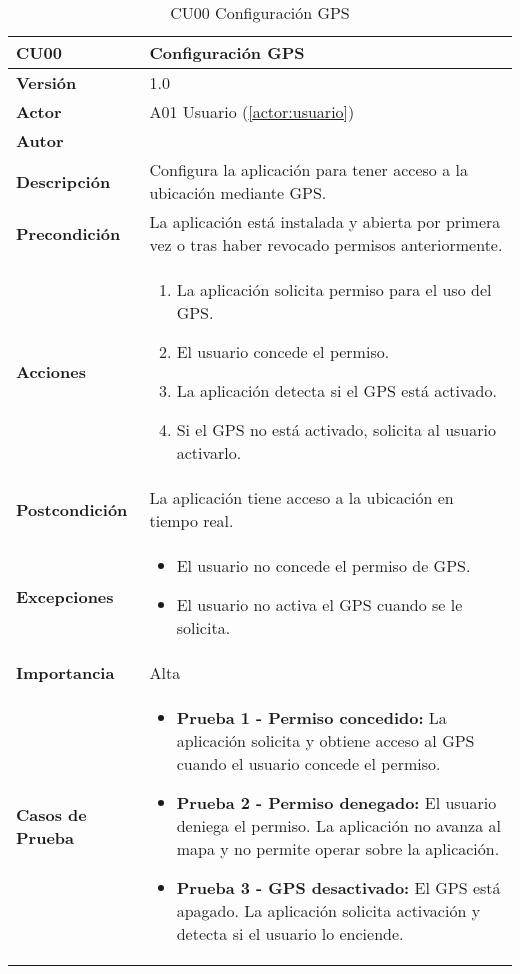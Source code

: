 \begin{table}[H]
	\centering
	\begin{tabularx}{\linewidth}{ p{} p{} }
		\toprule
		\textbf{CU00}    & \textbf{Configuración GPS} \\
		\toprule
		\textbf{Versión}              & 1.0    \\
		\textbf{Actor}                & A01 Usuario (\ref{actor:usuario}) \\
		\textbf{Autor}                & \autor \\
		\textbf{Descripción}          & Configura la aplicación para tener acceso a la ubicación mediante GPS. \\
		\textbf{Precondición}         & La aplicación está instalada y abierta por primera vez o tras haber revocado permisos anteriormente. \\
		\textbf{Acciones}             &
		\begin{enumerate}
			\def\labelenumi{\arabic{enumi}.}
			\tightlist
			\item La aplicación solicita permiso para el uso del GPS.
			\item El usuario concede el permiso.
			\item La aplicación detecta si el GPS está activado.
			\item Si el GPS no está activado, solicita al usuario activarlo.
		\end{enumerate}\\
		\textbf{Postcondición}        & La aplicación tiene acceso a la ubicación en tiempo real. \\
		\textbf{Excepciones}          & 
		\begin{itemize}
			\tightlist
			\item El usuario no concede el permiso de GPS.
			\item El usuario no activa el GPS cuando se le solicita.
		\end{itemize}\\
		\textbf{Importancia}          & Alta \\
		\textbf{Casos de Prueba}      & 
		\begin{itemize}
			\tightlist
			\item \textbf{Prueba 1 - Permiso concedido:} La aplicación solicita y obtiene acceso al GPS cuando el usuario concede el permiso.\vspace{2pt}
			\item \textbf{Prueba 2 - Permiso denegado:} El usuario deniega el permiso. La aplicación no avanza al mapa y no permite operar sobre la aplicación. \vspace{2pt}
			\item \textbf{Prueba 3 - GPS desactivado:} El GPS está apagado. La aplicación solicita activación y detecta si el usuario lo enciende.
		\end{itemize}\\
		\bottomrule
	\end{tabularx}
	\caption{CU00 Configuración GPS}
\end{table}



